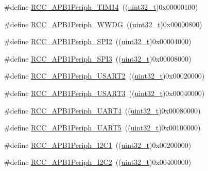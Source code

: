 \begin{DoxyCompactItemize}
\item 
\#define \hyperlink{group___a_p_b1__peripheral_ga7100c45768eea1484f6fd519b53e287d}{R\+C\+C\+\_\+\+A\+P\+B1\+Periph\+\_\+\+T\+I\+M14}~((\hyperlink{_p_e___types_8h_a33594304e786b158f3fb30289278f5af}{uint32\+\_\+t})0x00000100)
\item 
\#define \hyperlink{group___a_p_b1__peripheral_gad84e40be78ddc40b8eae1c2b0898f6b1}{R\+C\+C\+\_\+\+A\+P\+B1\+Periph\+\_\+\+W\+W\+DG}~((\hyperlink{_p_e___types_8h_a33594304e786b158f3fb30289278f5af}{uint32\+\_\+t})0x00000800)
\item 
\#define \hyperlink{group___a_p_b1__peripheral_gaa21f1dfb4fcf241c6f85a048eaca29df}{R\+C\+C\+\_\+\+A\+P\+B1\+Periph\+\_\+\+S\+P\+I2}~((\hyperlink{_p_e___types_8h_a33594304e786b158f3fb30289278f5af}{uint32\+\_\+t})0x00004000)
\item 
\#define \hyperlink{group___a_p_b1__peripheral_gabb0b40e839ef7403b086482e89d56f35}{R\+C\+C\+\_\+\+A\+P\+B1\+Periph\+\_\+\+S\+P\+I3}~((\hyperlink{_p_e___types_8h_a33594304e786b158f3fb30289278f5af}{uint32\+\_\+t})0x00008000)
\item 
\#define \hyperlink{group___a_p_b1__peripheral_gaa69c77220b943a42a4bacb8a3bf87dd0}{R\+C\+C\+\_\+\+A\+P\+B1\+Periph\+\_\+\+U\+S\+A\+R\+T2}~((\hyperlink{_p_e___types_8h_a33594304e786b158f3fb30289278f5af}{uint32\+\_\+t})0x00020000)
\item 
\#define \hyperlink{group___a_p_b1__peripheral_gaf72838a63d7d6200f251c1eb334cbaac}{R\+C\+C\+\_\+\+A\+P\+B1\+Periph\+\_\+\+U\+S\+A\+R\+T3}~((\hyperlink{_p_e___types_8h_a33594304e786b158f3fb30289278f5af}{uint32\+\_\+t})0x00040000)
\item 
\#define \hyperlink{group___a_p_b1__peripheral_ga839d7ae3386622158210ecf53d9cd989}{R\+C\+C\+\_\+\+A\+P\+B1\+Periph\+\_\+\+U\+A\+R\+T4}~((\hyperlink{_p_e___types_8h_a33594304e786b158f3fb30289278f5af}{uint32\+\_\+t})0x00080000)
\item 
\#define \hyperlink{group___a_p_b1__peripheral_gaa00c73f88a7af45fb29df97b07acd856}{R\+C\+C\+\_\+\+A\+P\+B1\+Periph\+\_\+\+U\+A\+R\+T5}~((\hyperlink{_p_e___types_8h_a33594304e786b158f3fb30289278f5af}{uint32\+\_\+t})0x00100000)
\item 
\#define \hyperlink{group___a_p_b1__peripheral_ga594f87d504f7d63697d841033d1538f6}{R\+C\+C\+\_\+\+A\+P\+B1\+Periph\+\_\+\+I2\+C1}~((\hyperlink{_p_e___types_8h_a33594304e786b158f3fb30289278f5af}{uint32\+\_\+t})0x00200000)
\item 
\#define \hyperlink{group___a_p_b1__peripheral_ga8eaeded403b5a2277fbfb3896c639416}{R\+C\+C\+\_\+\+A\+P\+B1\+Periph\+\_\+\+I2\+C2}~((\hyperlink{_p_e___types_8h_a33594304e786b158f3fb30289278f5af}{uint32\+\_\+t})0x00400000)

\end{DoxyCompactItemize}
